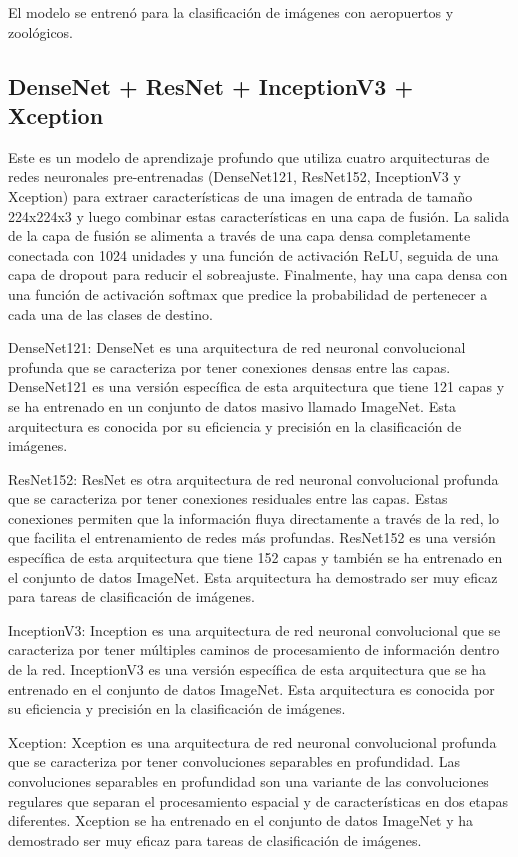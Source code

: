 \documentclass[article]{llncs}
\begin{document}
El modelo se entren\'o para la clasificación de im\'agenes con aeropuertos y zool\'ogicos.


\subsection{DenseNet + ResNet + InceptionV3 + Xception}

Este es un modelo de aprendizaje profundo que utiliza cuatro arquitecturas de redes neuronales pre-entrenadas 
(DenseNet121, ResNet152, InceptionV3 y Xception) para extraer características de una imagen de entrada de tamaño 
224x224x3 y luego combinar estas características en una capa de fusión. La salida de la capa de fusión se alimenta a 
través de una capa densa completamente conectada con 1024 unidades y una función de activación ReLU, seguida de una capa 
de dropout para reducir el sobreajuste. Finalmente, hay una capa densa con una función de activación softmax que predice 
la probabilidad de pertenecer a cada una de las clases de destino.

DenseNet121: DenseNet es una arquitectura de red neuronal convolucional profunda que se caracteriza por tener conexiones 
densas entre las capas. DenseNet121 es una versión específica de esta arquitectura que tiene 121 capas y se ha entrenado 
en un conjunto de datos masivo llamado ImageNet. Esta arquitectura es conocida por su eficiencia y precisión en la 
clasificación de imágenes.

ResNet152: ResNet es otra arquitectura de red neuronal convolucional profunda que se caracteriza por tener conexiones 
residuales entre las capas. Estas conexiones permiten que la información fluya directamente a través de la red, lo que 
facilita el entrenamiento de redes más profundas. ResNet152 es una versión específica de esta arquitectura que tiene 152 
capas y también se ha entrenado en el conjunto de datos ImageNet. Esta arquitectura ha demostrado ser muy eficaz para 
tareas de clasificación de imágenes.

InceptionV3: Inception es una arquitectura de red neuronal convolucional que se caracteriza por tener múltiples caminos 
de procesamiento de información dentro de la red. InceptionV3 es una versión específica de esta arquitectura que se ha 
entrenado en el conjunto de datos ImageNet. Esta arquitectura es conocida por su eficiencia y precisión en la 
clasificación de imágenes.

Xception: Xception es una arquitectura de red neuronal convolucional profunda que se caracteriza por tener convoluciones 
separables en profundidad. Las convoluciones separables en profundidad son una variante de las convoluciones regulares 
que separan el procesamiento espacial y de características en dos etapas diferentes. Xception se ha entrenado en el 
conjunto de datos ImageNet y ha demostrado ser muy eficaz para tareas de clasificación de imágenes.
\end{document}
